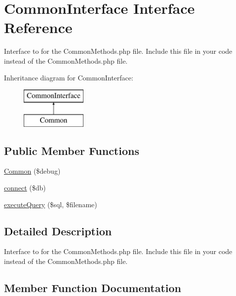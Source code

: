 \hypertarget{interface_common_interface}{}\section{Common\+Interface Interface Reference}
\label{interface_common_interface}


Interface to for the Common\+Methods.\+php file. Include this file in your code instead of the Common\+Methods.\+php file.  


Inheritance diagram for Common\+Interface\+:\begin{figure}[H]
\begin{center}
\leavevmode
\includegraphics[height=2.000000cm]{interface_common_interface}
\end{center}
\end{figure}
\subsection*{Public Member Functions}
\begin{DoxyCompactItemize}
\item 
\hyperlink{interface_common_interface_a4a9e6769ab6c946d0895e8d987df1c10}{Common} (\$debug)
\item 
\hyperlink{interface_common_interface_a1b1bd9b3f45a5fbd2549355282cdc96f}{connect} (\$db)
\item 
\hyperlink{interface_common_interface_a57a9dbd1203cf7b3ef3c5ce40d4047cc}{execute\+Query} (\$sql, \$filename)
\end{DoxyCompactItemize}


\subsection{Detailed Description}
Interface to for the Common\+Methods.\+php file. Include this file in your code instead of the Common\+Methods.\+php file. 

\subsection{Member Function Documentation}
